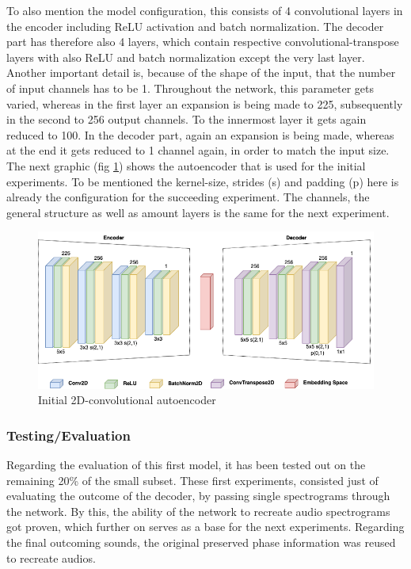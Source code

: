 To also mention the model configuration, this consists of 4 convolutional layers in the encoder including ReLU activation and batch normalization. The decoder part has therefore also 4 layers, which contain respective convolutional-transpose layers with also ReLU and batch normalization except the very last layer. Another important detail is, because of the shape of the input, that the number of input channels has to be 1. Throughout the network, this parameter gets varied, whereas in the first layer an expansion is being made to 225, subsequently in the second to 256 output channels. To the innermost layer it gets again reduced to 100. In the decoder part, again an expansion is being made, whereas at the end it gets reduced to 1 channel again, in order to match the input size. The next graphic (fig \ref{fig:cae_2D_init}) shows the autoencoder that is used for the initial experiments. To be mentioned the kernel-size, strides (s) and padding (p) here is already the configuration for the succeeding experiment. The channels, the general structure as well as amount layers is the same for the next experiment.

 \begin{figure}[htb!]
	\caption{Initial 2D-convolutional autoencoder}
	\label{fig:cae_2D_init}
	\centering
	\includegraphics[width=\textwidth]{images/experiments/autoencoder_init.png}
\end{figure}

\subsubsection{Testing/Evaluation}
Regarding the evaluation of this first model, it has been tested out on the remaining 20\% of the small subset. These first experiments, consisted just of evaluating the outcome of the decoder, by passing single spectrograms through the network. By this, the ability of the network to recreate audio spectrograms got proven, which further on serves as a base for the next experiments. Regarding the final outcoming sounds, the original preserved phase information was reused to recreate audios.

